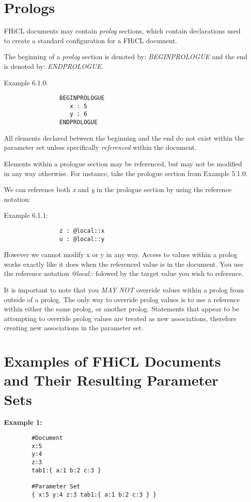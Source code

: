 \documentclass{memarticle}
\begin{document}
\chapter{Prologs}
        FHiCL documents may contain \emph{prolog} sections,
	which contain declarations used to create a standard configuration for a FHiCL document.
        \par
        The beginning of a \emph{prolog} section is denoted by:
        \emph{BEGINPROLOGUE}
        and the end is denoted by:
        \emph{ENDPROLOGUE}.
        \par
        Example 6.1.0:
        \begin{verbatim}
                BEGINPROLOGUE
                   x : 5
                   y : 6
                ENDPROLOGUE
        \end{verbatim}
        All elements declared between the beginning and the end
        do not exist within the parameter set unless specifically
        \emph{referenced} within the document.
        \par
        Elements within a prologue section may be referenced,
        but may not be modified in any way otherwise.
        For instance, take the prologue section from Example 5.1.0.
        \par
        We can reference both \emph{x} and \emph{y} in the prologue section by using the reference notation:
        \par
        Example 6.1.1:
        \begin{verbatim}
                z : @local::x
                u : @local::y
        \end{verbatim}
        \par
        However we cannot modify x or y in any way.
        Access to values within a prolog works exactly like it does when the referenced value is in the document.
        You use the reference notation \emph{@local::} folowed by the target value you wish to reference.
        \par
        It is important to note that you \emph{MAY NOT} override values within a prolog from outside of a prolog.
        The only way to override prolog values is to use a reference within either the same prolog, or another prolog.
        Statements that appear to be attempting to override prolog values are treated as new associations, therefore creating
        new associations in the parameter set.

\chapter{Examples of FHiCL Documents and Their Resulting Parameter Sets}
	\textbf{Example 1:}	
	\begin{verbatim}
		#Document
		x:5
		y:4
		z:3
		tab1:{ a:1 b:2 c:3 }
	
		#Parameter Set
		{ x:5 y:4 z:3 tab1:{ a:1 b:2 c:3 } }
	\end{verbatim}
\end{document}

